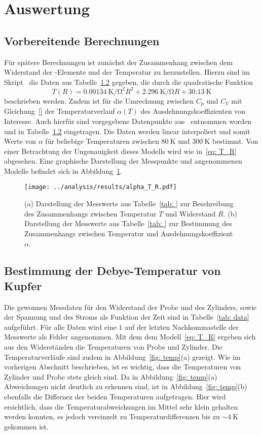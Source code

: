 \section{Auswertung}



\subsection{Vorbereitende Berechnungen}
Für spätere Berechnungen ist zunächst der Zusammenhang zwischen dem Widerstand der -Elemente und der Temperatur 
zu herzustellen. Hierzu sind im Skript~\cite{anleitung47} die Daten aus Tabelle~\ref{} gegeben, die durch die quadratische 
Funktion
\begin{equation}
    T(R) = \SI{0.00134}{\kelvin \per \ohm\squared} R^2 + \SI{2.296}{\kelvin \per \ohm} R + \SI{30.13}{\kelvin}
    \label{eq: T_R}
\end{equation}
beschrieben werden. Zudem ist für die Umrechnung zwischen $C_p$ und $C_V$ mit Gleichung~\eqref{} der Temperaturverlauf 
$\alpha(T)$ des Ausdehnungskoeffizienten von Interesse. Auch hierfür sind vorgegebene Datenpunkte aus~\cite{} entnommen 
worden und in Tabelle~\ref{} eingetragen. Die Daten werden linear interpoliert und somit Werte von $\alpha$ für 
beliebige Temperaturen zwischen $\SI{80}{\kelvin}$ und $\SI{300}{\kelvin}$ bestimmt. Von einer Betrachtung der Ungenauigkeit 
dieses Modells wird wie in~\eqref{eq: T_R} abgesehen. Eine graphische Darstellung der Messpunkte und angenommenen 
Modelle befindet sich in Abbildung~\ref{fig: alpha_T_R}.
\begin{figure}
\centering
\texttt{[image: ../analysis/results/alpha\_T\_R.pdf]}
\caption{(a) Darstellung der Messwerte aus Tabelle~\ref{tab: } zur Beschreibung des Zusammenhangs zwischen Temperatur 
        $T$ und Widerstand $R$.
        (b) Darstellung der Messwerte aus Tabelle~\ref{tab: } zur Bestimmung des Zusammenhangs zwischen Temperatur und
         Ausdehnungskoeffizient $\alpha$.}
\label{fig: alpha_T_R}
\end{figure}


\subsection{Bestimmung der Debye-Temperatur von Kupfer}
Die gewonnen Messdaten für den Widerstand der Probe und des Zylinders, sowie der Spannung und des Stroms
als Funktion der Zeit sind in Tabelle~\ref{tab: data} aufgeführt. Für alle Daten wird eine $1$ auf der letzten
Nachkommastelle der Messwerte als Fehler angenommen. 
Mit dem dem Modell~\eqref{eq: T_R} ergeben sich aus den Widerständen die Temperaturen von Probe und Zylinder.
Die Temperaturverläufe sind zudem in Abbildung~\ref{fig: temp}(a) gezeigt. Wie im vorherigen Abschnitt beschrieben, ist es 
wichtig, dass die Temperaturen von Zylinder und Probe stets gleich sind. Da in Abbildung~\ref{fig: temp}(a) Abweichungen nicht 
deutlich zu erkennen sind, ist in Abbildung~\ref{fig: temp}(b) ebenfalls die Differnez der beiden Temperaturen 
aufgetragen. Hier wird ersichtlich, dass die Temperaturabweichungen im Mittel sehr klein gehalten werden konnten, es
jedoch vereinzelt zu Temperaturdifferenzen bis zu $\sim\!\SI{4}{\kelvin}$ gekommen ist.



